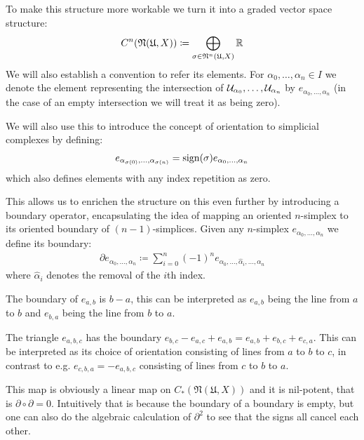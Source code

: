 To make this structure more workable we turn it into a graded vector space structure:
\begin{align*}
	C^n(\mathfrak{N}(\mathfrak{U}, X)) \coloneqq \bigoplus_{\sigma \in \mathfrak{N}^n(\mathfrak{U}, X)} \mathbb{R}
\end{align*}
We will also establish a convention to refer its elements. For $\alpha_0, \dots, \alpha_n \in I$ we 
denote the element representing the intersection of $\mathcal{U}_{\alpha_0}, \dots, \mathcal{U}_{\alpha_n}$ by
$e_{\alpha_0, \dots, \alpha_n}$ (in the case of an empty intersection we will treat it as being zero).

We will also use this to introduce the concept of orientation to simplicial complexes by defining:
\begin{align*}
	e_{\alpha_{\sigma(0)}, \dots, \alpha_{\sigma(n)}} = \operatorname{sign}(\sigma) e_{\alpha_0, \dots, \alpha_n}
\end{align*}
which also defines elements with any index repetition as zero.

This allows us to enrichen the structure on this even further by introducing a boundary operator,
encapsulating the idea of mapping an oriented $n$-simplex to its oriented boundary of $(n - 1)$-simplices.
Given any $n$-simplex $e_{\alpha_0, \dots, \alpha_n}$ we define its boundary:
\begin{align*}
	\partial e_{\alpha_0, \dots, \alpha_n} \coloneqq \sum_{i = 0}^n (-1)^n e_{\alpha_0, \dots, \hat{\alpha}_i, \dots, \alpha_n}
\end{align*}
where $\hat{\alpha}_i$ denotes the removal of the $i$th index.

\begin{example}
The boundary of $e_{a, b}$ is $b - a$, this can be interpreted as $e_{a, b}$ being the line from $a$ to $b$
and $e_{b, a}$ being the line from $b$ to $a$.

The triangle $e_{a,b,c}$ has the boundary $e_{b, c} - e_{a, c} + e_{a, b} = e_{a,b} + e_{b, c} + e_{c, a}$.
This can be interpreted as its choice of orientation consisting of lines from $a$ to $b$ to $c$, in contrast
to e.g. $e_{c, b, a} = -e_{a, b, c}$ consisting of lines from $c$ to $b$ to $a$.
\end{example}

This map is obviously a linear map on $C_*(\mathfrak{N}(\mathfrak{U}, X))$ and it is nil-potent, that is
$\partial \circ \partial = 0$. Intuitively that is because the boundary of a boundary is empty, but one
can also do the algebraic calculation of $\partial^2$ to see that the signs all cancel each other.

